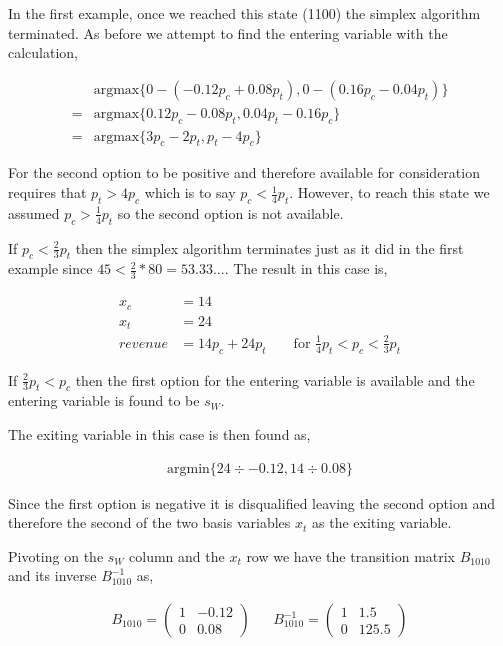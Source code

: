 In the first example, once we reached this state (1100) the simplex
algorithm terminated. As before we attempt to find the entering
variable with the calculation,

\begin{align*}
&\text{argmax}\{0 - (-0.12p_c + 0.08p_t), 0 - (0.16p_c - 0.04p_t)\}\\
= &\text{argmax}\{0.12p_c - 0.08p_t, 0.04p_t - 0.16p_c\}\\
= &\text{argmax}\{3p_c - 2p_t, p_t - 4p_c\}
\end{align*}

For the second option to be positive and therefore available for
consideration requires that $p_t > 4p_c$ which is to say $p_c <
\frac{1}{4}p_t$. However, to reach this state we assumed $p_c >
\frac{1}{4}p_t$ so the second option is not available.

If $p_c < \frac{2}{3}p_t$ then the simplex algorithm terminates just
as it did in the first example since $45 < \frac{2}{3}*80 =
53.33...$. The result in this case is,

\begin{align*}
x_c &= 14\\
x_t &= 24\\
revenue &= 14p_c + 24p_t && \text{ for } \frac{1}{4}p_t < p_c < \frac{2}{3}p_t
\end{align*}

If $\frac{2}{3}p_t < p_c$ then the first option for the entering
variable is available and the entering variable is found to be $s_W$.

The exiting variable in this case is then found as,

\begin{align*}
\text{argmin}\{24 \div -0.12, 14 \div 0.08\}
\end{align*}

Since the first option is negative it is disqualified leaving the
second option and therefore the second of the two basis variables
$x_t$ as the exiting variable. 

Pivoting on the $s_W$ column and the $x_t$ row we have the transition
matrix $B_{1010}$ and its inverse $B_{1010}^{-1}$ as,

\begin{align*}
B_{1010} = \begin{pmatrix}1&-0.12\\0&0.08\end{pmatrix} && 
B_{1010}^{-1} = \begin{pmatrix}1&1.5\\0&125.5\end{pmatrix}
\end{align*}

